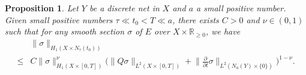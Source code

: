 \documentclass[12pt, reqno]{amsart}
\theoremstyle{plain}%
\newtheorem{proposition}[theorem]{Proposition}
\theoremstyle{definition}
\theoremstyle{remark}
\numberwithin{equation}{section}
\newcommand{\R}{\mathbb{R}}
\begin{document}
\begin{proposition}\label{prop:interpolation}
		Let $Y$ be a discrete net in $X$ and $a$ a small positive number. Given small positive numbers $\tau\ll t_0<T\ll a$, there exists $C>0$ and $\nu\in(0,1)$ such that for any smooth section $\sigma$ of $E$ over $X\times\R_{\geq 0}$, we have
	\begin{equation}\label{eq:interpolation}
	\begin{split}
			&\|\sigma\|_{H_1(X\times N_\tau(t_0))}\\\leq &C \|\sigma\|_{H_1(X\times[0,T])}^\nu\Big(\|Q\sigma\|_{L^2(X\times[0,T])}+\Big\|\frac{\partial}{\partial t}\sigma\Big\|_{L^2(N_a(Y)\times\{0\})}\Big)^{1-\nu}.
	\end{split}
	\end{equation}
\end{proposition}
\end{document}
